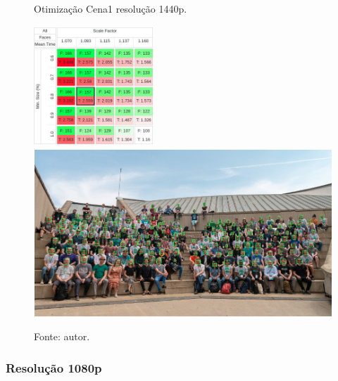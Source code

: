 \begin{figure}[h]
    \centering
    \caption[Otimização Cena1 resolução 1440p.]{Otimização Cena1 resolução 1440p.}
    \includegraphics[width=0.4\textwidth]{Cap4_Experimentos_Realizados/Figures/cena1_param_1440p_matriz.jpg}
    \includegraphics[width=1.0\textwidth]{Cap4_Experimentos_Realizados/Figures/cena1_param_1440p_faces.jpg}
    \caption*{Fonte: autor.}
    \label{fig:otimizacaoCena1_1440p}
\end{figure}

\subsubsection{Resolução 1080p}

